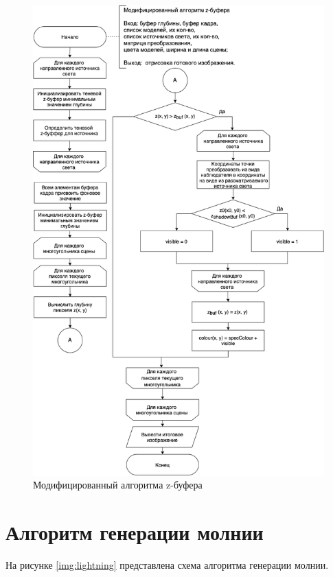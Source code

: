 \begin{figure}[H]
	\centering
	\includegraphics[scale=0.5]{include/mod_zbuf.png}
	\caption{Модифицированный алгоритма z-буфера}
	\label{img:r2}
\end{figure} 

\section{Алгоритм генерации молнии}

На рисунке \ref{img:lightning} представлена схема алгоритма генерации молнии.

